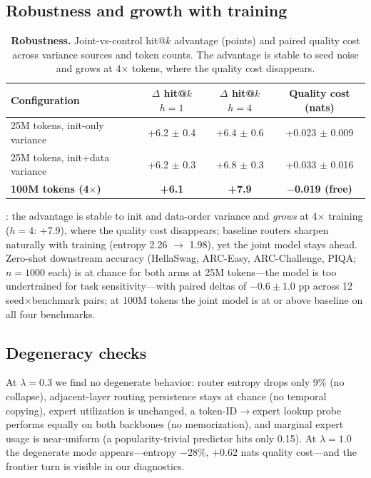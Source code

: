 \documentclass[10pt,letterpaper]{article}
\begin{document}
\subsection{Robustness and growth with training}
\label{sec:robust}

\begin{table}[t]
  \centering
  \caption{\textbf{Robustness.} Joint-vs-control hit@$k$ advantage (points) and paired quality cost across variance sources and token counts. The advantage is stable to seed noise and grows at 4$\times$ tokens, where the quality cost disappears.}
  \label{tab:robust}
  \begin{tabular}{lccc}
    \toprule
    Configuration & $\Delta$ hit@$k$ $h{=}1$ & $\Delta$ hit@$k$ $h{=}4$ & Quality cost (nats) \\
    \midrule
    25M tokens, init-only variance & +6.2 $\pm$ 0.4 & +6.4 $\pm$ 0.6 & +0.023 $\pm$ 0.009 \\
    25M tokens, init+data variance & +6.2 $\pm$ 0.3 & +6.8 $\pm$ 0.3 & +0.033 $\pm$ 0.016 \\
    \midrule
    \textbf{100M tokens (4$\times$)} & \textbf{+6.1} & \textbf{+7.9} & \textbf{$-$0.019 (free)} \\
    \bottomrule
  \end{tabular}
\end{table}

: the advantage is stable to init and data-order variance and \emph{grows} at 4$\times$ training ($h{=}4$: +7.9), where the quality cost disappears; baseline routers sharpen naturally with training (entropy 2.26 $\to$ 1.98), yet the joint model stays ahead. Zero-shot downstream accuracy (HellaSwag, ARC-Easy, ARC-Challenge, PIQA; $n{=}1000$ each) is at chance for both arms at 25M tokens---the model is too undertrained for task sensitivity---with paired deltas of $-0.6 \pm 1.0$ pp across 12 seed$\times$benchmark pairs; at 100M tokens the joint model is at or above baseline on all four benchmarks.

\subsection{Degeneracy checks}
\label{sec:degeneracy}

At $\lambda{=}0.3$ we find no degenerate behavior: router entropy drops only 9\% (no collapse), adjacent-layer routing persistence stays at chance (no temporal copying), expert utilization is unchanged, a token-ID$\to$expert lookup probe performs equally on both backbones (no memorization), and marginal expert usage is near-uniform (a popularity-trivial predictor hits only 0.15). At $\lambda{=}1.0$ the degenerate mode appears---entropy $-$28\%, +0.62 nats quality cost---and the frontier turn is visible in our diagnostics.
\end{document}
